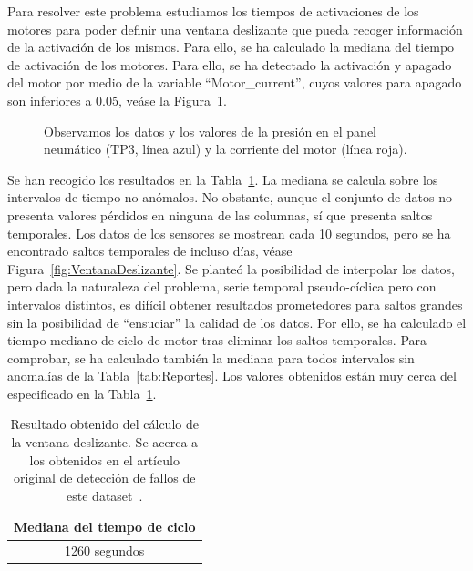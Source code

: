 \documentclass[12pt,letterpaper]{article}
\begin{document}
Para resolver este problema estudiamos los tiempos de activaciones de los motores para poder definir una ventana deslizante que pueda recoger información de la activación de los mismos. 
Para ello, se ha calculado la mediana del tiempo de activación de los motores. Para ello, se ha detectado la activación y apagado del motor por medio de la variable ``Motor\_current'', cuyos 
valores para apagado son inferiores a 0.05, veáse la Figura~\ref{fig:VisualizacionDatos}.

\begin{figure}[htp]
        \centering
        \caption{Observamos los datos y los valores de la presión en el panel neumático (TP3, línea azul) y la corriente del motor (línea roja).}
        \label{fig:VisualizacionDatos}
\end{figure}

Se han recogido los resultados en la Tabla~\ref{tab:TiempoCiclo}. La mediana se calcula sobre los intervalos de tiempo no anómalos. No obstante, 
aunque el conjunto de datos no presenta valores pérdidos en ninguna de las columnas, sí que presenta saltos temporales. Los datos de los sensores se mostrean cada 10 segundos, 
pero se ha encontrado saltos temporales de incluso días, véase Figura~\ref{fig:VentanaDeslizante}. Se planteó la posibilidad de interpolar los datos, pero dada la naturaleza 
del problema, serie temporal pseudo-cíclica pero con intervalos distintos, es difícil obtener resultados prometedores para saltos grandes sin la posibilidad de ``ensuciar'' la calidad de los datos.
Por ello, se ha calculado el tiempo mediano de ciclo de motor tras eliminar los saltos temporales. Para comprobar, se ha calculado también la mediana 
para todos intervalos sin anomalías de la Tabla~\ref{tab:Reportes}. Los valores obtenidos están muy cerca del especificado en la Tabla~\ref{tab:TiempoCiclo}.

\begin{table}[htp]
    \centering
    \begin{tabular}{|c|}
    \hline
    \textbf{Mediana del tiempo de ciclo} \\ \hline 
    1260 segundos\\
    \hline
    \end{tabular}
    \caption{Resultado obtenido del cálculo de la ventana deslizante. Se acerca a los obtenidos en el artículo original de detección de fallos de este dataset~\cite{FailureDetection}.}
    \label{tab:TiempoCiclo}
\end{table}
\end{document}
